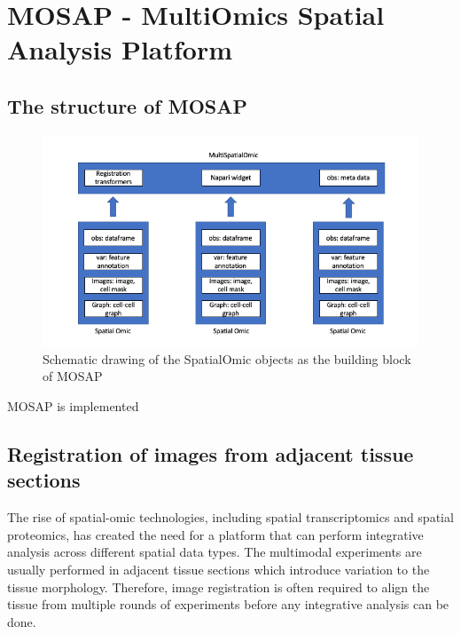 \section{MOSAP - MultiOmics Spatial Analysis Platform}
\subsection{The structure of MOSAP}
\begin{figure}
    \centering
    \includegraphics[width=0.8\columnwidth]{Chapter4/Figures/Chap4_MOSAP_OOP.png}
    \caption[Schematic drawing of the SpatialOmic objects as the building block of MOSAP]{Schematic drawing of the SpatialOmic objects as the building block of MOSAP}
    \label{Chap4:MOSAP_OOP}
\end{figure}
MOSAP is implemented 
\subsection{Registration of images from adjacent tissue sections}
The rise of spatial-omic technologies, including spatial transcriptomics and spatial proteomics, has created the need for a platform that can perform integrative analysis across different spatial data types. The multimodal experiments are usually performed in adjacent tissue sections which introduce variation to the tissue morphology. Therefore, image registration is often required to align the tissue from multiple rounds of experiments before any integrative analysis can be done.  

